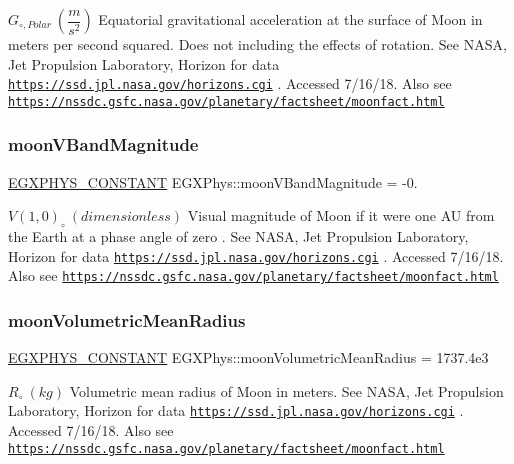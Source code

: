 $ G_{\circ,Polar} \ (\dfrac{m}{s^2})$ Equatorial gravitational acceleration at the surface of Moon in meters per second squared. Does not including the effects of rotation. See N\+A\+SA, Jet Propulsion Laboratory, Horizon for data \href{https://ssd.jpl.nasa.gov/horizons.cgi}{\tt https\+://ssd.\+jpl.\+nasa.\+gov/horizons.\+cgi} . Accessed 7/16/18. Also see \href{https://nssdc.gsfc.nasa.gov/planetary/factsheet/moonfact.html}{\tt https\+://nssdc.\+gsfc.\+nasa.\+gov/planetary/factsheet/moonfact.\+html} \mbox{\label{group___e_g_x_phys-_constants-_astrophysics-_solar_system-_moon-_bulk_ga1b56f47a31d7ed6fb6d9884dec07ab7d}} 
\subsubsection{\texorpdfstring{moon\+V\+Band\+Magnitude}{moonVBandMagnitude}}
{\footnotesize\ttfamily \mbox{\hyperlink{group___e_g_x_phys-_constants-_macros_ga76980d288494ce1714c9ac68a95ba702}{E\+G\+X\+P\+H\+Y\+S\+\_\+\+C\+O\+N\+S\+T\+A\+NT}} E\+G\+X\+Phys\+::moon\+V\+Band\+Magnitude = -\/0.}

$ V(1,0)_{\circ} \ (dimensionless)$ Visual magnitude of Moon if it were one AU from the Earth at a phase angle of zero . See N\+A\+SA, Jet Propulsion Laboratory, Horizon for data \href{https://ssd.jpl.nasa.gov/horizons.cgi}{\tt https\+://ssd.\+jpl.\+nasa.\+gov/horizons.\+cgi} . Accessed 7/16/18. Also see \href{https://nssdc.gsfc.nasa.gov/planetary/factsheet/moonfact.html}{\tt https\+://nssdc.\+gsfc.\+nasa.\+gov/planetary/factsheet/moonfact.\+html} \mbox{\label{group___e_g_x_phys-_constants-_astrophysics-_solar_system-_moon-_bulk_ga02996f309aca6182877833bff0d325dd}} 
\subsubsection{\texorpdfstring{moon\+Volumetric\+Mean\+Radius}{moonVolumetricMeanRadius}}
{\footnotesize\ttfamily \mbox{\hyperlink{group___e_g_x_phys-_constants-_macros_ga76980d288494ce1714c9ac68a95ba702}{E\+G\+X\+P\+H\+Y\+S\+\_\+\+C\+O\+N\+S\+T\+A\+NT}} E\+G\+X\+Phys\+::moon\+Volumetric\+Mean\+Radius = 1737.\+4e3}

$R_{\circ} \ (kg)$ Volumetric mean radius of Moon in meters. See N\+A\+SA, Jet Propulsion Laboratory, Horizon for data \href{https://ssd.jpl.nasa.gov/horizons.cgi}{\tt https\+://ssd.\+jpl.\+nasa.\+gov/horizons.\+cgi} . Accessed 7/16/18. Also see \href{https://nssdc.gsfc.nasa.gov/planetary/factsheet/moonfact.html}{\tt https\+://nssdc.\+gsfc.\+nasa.\+gov/planetary/factsheet/moonfact.\+html} 